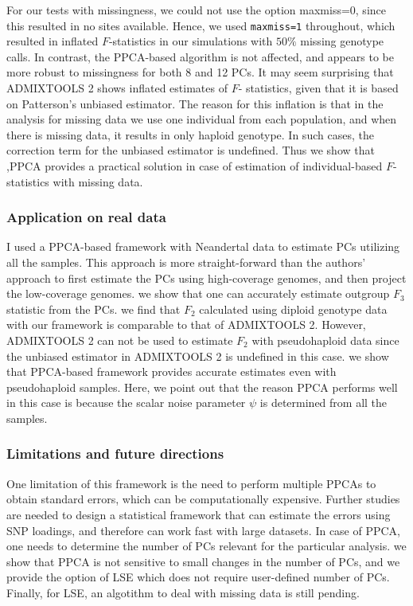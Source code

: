 \documentclass[12pt]{article}
\begin{document}
For our tests with missingness, we could not use the option maxmiss=0, since this resulted in no sites available. Hence, we used \texttt{maxmiss=1} throughout, which resulted in inflated $F$-statistics in our simulations with $50\%$ missing genotype calls. In contrast, the PPCA-based algorithm is not affected, and appears to be more robust to missingness for both 8 and 12 PCs. It may seem surprising that ADMIXTOOLS 2 shows inflated estimates of $F$- statistics, given that it is based on Patterson's unbiased estimator. The reason for this inflation is that in the analysis for missing data we use one individual from each population, and when there is missing data, it results in only haploid genotype. In such cases, the correction term for the unbiased estimator is undefined. Thus we show that ,PPCA provides a practical solution in case of estimation of individual-based $F$-statistics with missing data. 

\subsubsection{Application on real data}
I used a PPCA-based framework with Neandertal data to estimate PCs utilizing all the samples. This approach is more straight-forward than the authors' approach to first estimate the PCs using high-coverage genomes, and then project the low-coverage genomes. we show that one can accurately estimate outgroup $F_3$ statistic from the PCs. we find that $F_2$ calculated using diploid genotype data with our framework is comparable to that of ADMIXTOOLS 2. However, ADMIXTOOLS 2 can not be used to estimate $F_2$ with pseudohaploid data since the unbiased estimator in ADMIXTOOLS 2 is undefined in this case. we show that PPCA-based framework provides accurate estimates even with pseudohaploid samples. Here, we point out that the reason PPCA performs well in this case is because the scalar noise parameter $\psi$ is determined from all the samples.

\subsubsection{Limitations and future directions}
One limitation of this framework is the need to perform multiple PPCAs to obtain standard errors, which can be computationally expensive. Further studies are needed to design a statistical framework that can estimate the errors using SNP loadings, and therefore can work fast with large datasets. In case of PPCA, one needs to determine the number of PCs relevant for the particular analysis. we show that PPCA is not sensitive to small changes in the number of PCs, and we provide the option of LSE which does not require user-defined number of PCs. Finally, for LSE, an algotithm to deal with missing data is still pending. 
\end{document}

